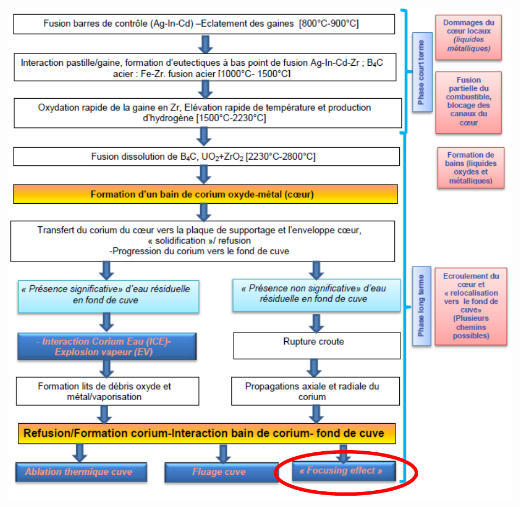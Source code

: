 \begin{frame}[fragile]
\begin{center}
\includegraphics[height=\textheight]{Figures/transition_PP.png}
\end{center}
\end{frame}
